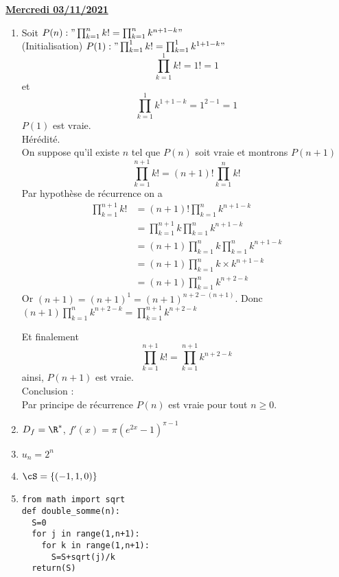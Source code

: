 \documentclass[a4paper, 11pt,reqno]{article}
\newcommand{\jour}[1]{
\begin{center}
\underline{\textbf{#1}}
\end{center}

 }
\begin{document}
\jour{Mercredi 03/11/2021}
\begin{correction}
\begin{enumerate}
\item Soit $P(n )  : "\prod_{k=1}^n k! = \prod_{k=1}^n k^{n+1-k}"$\\

(Initialisation) $P(1) :"\prod_{k=1}^1 k! = \prod_{k=1}^1 k^{1+1-k}" $
$$\prod_{k=1}^1 k! = 1! =1$$
et 
$$\prod_{k=1}^1 k^{1+1-k} = 1^{2-1} =1$$
$P(1)$ est vraie. \\

Hérédité. \\
On suppose qu'il existe $n$ tel que $P(n) $ soit vraie et montrons $P(n+1)$
$$\prod_{k=1}^{n+1} k! = (n+1)!\prod_{k=1}^n k! $$
Par hypothèse de récurrence on a 
\begin{align*}
\prod_{k=1}^{n+1} k! &=  (n+1)! \prod_{k=1}^n k^{n+1-k}\\
								&=  \prod_{k=1}^{n+1} k \prod_{k=1}^n k^{n+1-k}\\
								&=  (n+1) \prod_{k=1}^{n} k \prod_{k=1}^n k^{n+1-k}\\
								&=  (n+1) \prod_{k=1}^{n} k\times k^{n+1-k}\\
								&=  (n+1) \prod_{k=1}^{n} k^{n+2-k}
\end{align*}
Or $(n+1)  =(n+1) ^{1} = (n+1)^{n+2-(n+1)} $. Donc 
$ (n+1) \prod_{k=1}^{n} k^{n+2-k} =\prod_{k=1}^{n+1} k^{n+2-k}$

Et finalement $$\prod_{k=1}^{n+1} k!  = \prod_{k=1}^{n+1} k^{n+2-k}$$
ainsi, $P(n+1) $ est vraie. \\

Conclusion : \\
Par principe de récurrence $P(n) $ est vraie pour tout $n\geq 0$. 


\item $D_f=\R^*$, $f'(x) = \pi (e^{2x}-1)^{\pi-1}$
\item $u_n=2^n$
\item $\cS=\{ (-1,1,0)\}$
\item 
\begin{lstlisting}
from math import sqrt
def double_somme(n):
  S=0
  for j in range(1,n+1):
    for k in range(1,n+1):
      S=S+sqrt(j)/k
  return(S)
\end{lstlisting}

\end{enumerate}
\end{correction} 
\end{document}
